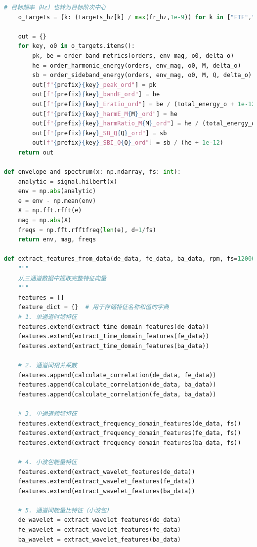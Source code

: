 \documentclass[a4paper]{CPIPC}
\numberwithin{equation}{section}
\begin{document}
\begin{lstlisting}[language=Python, caption=Feature Extraction]
    # 目标频率（Hz）也转为目标阶次中心
    o_targets = {k: (targets_hz[k] / max(fr_hz,1e-9)) for k in ["FTF","BPFO","BPFI","BSF"]}

    out = {}
    for key, o0 in o_targets.items():
        pk, be = order_band_metrics(orders, env_mag, o0, delta_o)
        he = order_harmonic_energy(orders, env_mag, o0, M, delta_o)
        sb = order_sideband_energy(orders, env_mag, o0, M, Q, delta_o)
        out[f"{prefix}{key}_peak_ord"] = pk
        out[f"{prefix}{key}_bandE_ord"] = be
        out[f"{prefix}{key}_Eratio_ord"] = be / (total_energy_o + 1e-12)
        out[f"{prefix}{key}_harmE_M{M}_ord"] = he
        out[f"{prefix}{key}_harmRatio_M{M}_ord"] = he / (total_energy_o + 1e-12)
        out[f"{prefix}{key}_SB_Q{Q}_ord"] = sb
        out[f"{prefix}{key}_SBI_Q{Q}_ord"] = sb / (he + 1e-12)
    return out

def envelope_and_spectrum(x: np.ndarray, fs: int):
    analytic = signal.hilbert(x)
    env = np.abs(analytic)
    e = env - np.mean(env)
    X = np.fft.rfft(e)
    mag = np.abs(X)
    freqs = np.fft.rfftfreq(len(e), d=1/fs)
    return env, mag, freqs

def extract_features_from_data(de_data, fe_data, ba_data, rpm, fs=12000):
    """
    从三通道数据中提取完整特征向量
    """
    features = []
    feature_dict = {}  # 用于存储特征名称和值的字典
    # 1. 单通道时域特征
    features.extend(extract_time_domain_features(de_data))
    features.extend(extract_time_domain_features(fe_data))
    features.extend(extract_time_domain_features(ba_data))
    
    # 2. 通道间相关系数
    features.append(calculate_correlation(de_data, fe_data))
    features.append(calculate_correlation(de_data, ba_data))
    features.append(calculate_correlation(fe_data, ba_data))
    
    # 3. 单通道频域特征
    features.extend(extract_frequency_domain_features(de_data, fs))
    features.extend(extract_frequency_domain_features(fe_data, fs))
    features.extend(extract_frequency_domain_features(ba_data, fs))
    
    # 4. 小波包能量特征
    features.extend(extract_wavelet_features(de_data))
    features.extend(extract_wavelet_features(fe_data))
    features.extend(extract_wavelet_features(ba_data))
    
    # 5. 通道间能量比特征（小波包）
    de_wavelet = extract_wavelet_features(de_data)
    fe_wavelet = extract_wavelet_features(fe_data)
    ba_wavelet = extract_wavelet_features(ba_data)
    

\end{lstlisting}
\end{document}
